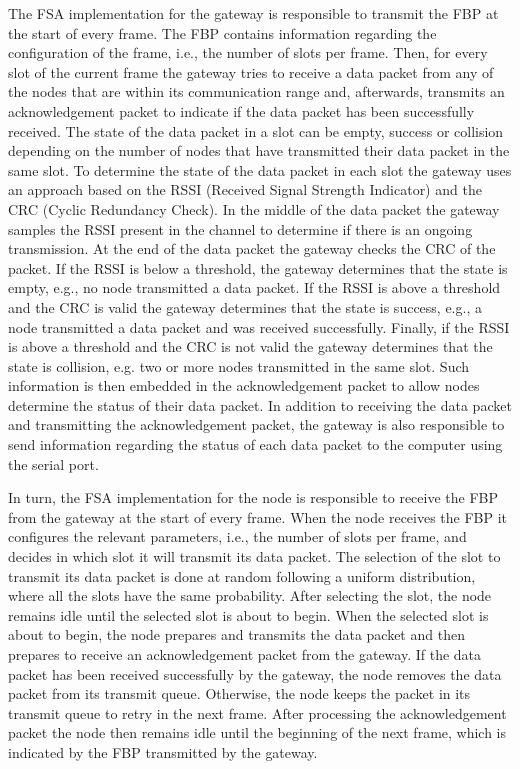 The FSA implementation for the gateway is responsible to transmit the FBP at the start of every frame. The FBP contains information regarding the configuration of the frame, i.e., the number of slots per frame. Then, for every slot of the current frame the gateway tries to receive a data packet from any of the nodes that are within its communication range and, afterwards, transmits an acknowledgement packet to indicate if the data packet has been successfully received. The state of the data packet in a slot can be empty, success or collision depending on the number of nodes that have transmitted their data packet in the same slot. To determine the state of the data packet in each slot the gateway uses an approach based on the RSSI (Received Signal Strength Indicator) and the CRC (Cyclic Redundancy Check). In the middle of the data packet the gateway samples the RSSI present in the channel to determine if there is an ongoing transmission. At the end of the data packet the gateway checks the CRC of the packet. If the RSSI is below a threshold, the gateway determines that the state is empty, e.g., no node transmitted a data packet. If the RSSI is above a threshold and the CRC is valid the gateway determines that the state is success, e.g., a node transmitted a data packet and was received successfully. Finally, if the RSSI is above a threshold and the CRC is not valid the gateway determines that the state is collision, e.g. two or more nodes transmitted in the same slot. Such information is then embedded in the acknowledgement packet to allow nodes determine the status of their data packet. In addition to receiving the data packet and transmitting the acknowledgement packet, the gateway is also responsible to send information regarding the status of each data packet to the computer using the serial port.

In turn, the FSA implementation for the node is responsible to receive the FBP from the gateway at the start of every frame. When the node receives the FBP it configures the relevant parameters, i.e., the number of slots per frame, and decides in which slot it will transmit its data packet. The selection of the slot to transmit its data packet is done at random following a uniform distribution, where all the slots have the same probability. After selecting the slot, the node remains idle until the selected slot is about to begin. When the selected slot is about to begin, the node prepares and transmits the data packet and then prepares to receive an acknowledgement packet from the gateway. If the data packet has been received successfully by the gateway, the node removes the data packet from its transmit queue. Otherwise, the node keeps the packet in its transmit queue to retry in the next frame. After processing the acknowledgement packet the node then remains idle until the beginning of the next frame, which is indicated by the FBP transmitted by the gateway.

